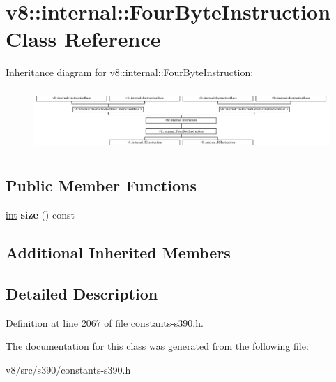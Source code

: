 \hypertarget{classv8_1_1internal_1_1FourByteInstruction}{}\section{v8\+:\+:internal\+:\+:Four\+Byte\+Instruction Class Reference}
\label{classv8_1_1internal_1_1FourByteInstruction}
Inheritance diagram for v8\+:\+:internal\+:\+:Four\+Byte\+Instruction\+:\begin{figure}[H]
\begin{center}
\leavevmode
\includegraphics[height=2.364865cm]{classv8_1_1internal_1_1FourByteInstruction}
\end{center}
\end{figure}
\subsection*{Public Member Functions}
\begin{DoxyCompactItemize}
\item 
\mbox{\label{classv8_1_1internal_1_1FourByteInstruction_a493c3b20ae3b87a8f4e8bd5b7ae6b0f5}} 
\mbox{\hyperlink{classint}{int}} {\bfseries size} () const
\end{DoxyCompactItemize}
\subsection*{Additional Inherited Members}


\subsection{Detailed Description}


Definition at line 2067 of file constants-\/s390.\+h.



The documentation for this class was generated from the following file\+:\begin{DoxyCompactItemize}
\item 
v8/src/s390/constants-\/s390.\+h\end{DoxyCompactItemize}
